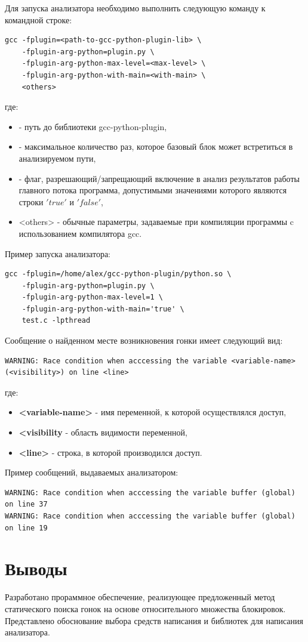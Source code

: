 Для запуска анализатора необходимо выполнить следующую команду к командной строке:
\begin{verbatim}
gcc -fplugin=<path-to-gcc-python-plugin-lib> \
    -fplugin-arg-python=plugin.py \
    -fplugin-arg-python-max-level=<max-level> \
    -fplugin-arg-python-with-main=<with-main> \
    <others>
\end{verbatim}
где:
\begin{itemize}
  \item <path-to-gcc-python-plugin-lib> - путь до библиотеки gcc-python-plugin,
  \item <max-level> - максимальное количество раз, которое базовый блок может встретиться в анализируемом пути,
  \item <with-main> - флаг, разрешающий/запрещающий включение в анализ результатов работы главного потока программа, допустимыми значениями которого являются строки $'true'$ и $'false'$,
  \item <others> - обычные параметры, задаваемые при компиляции программы c использованием компилятора gcc.
\end{itemize}

Пример запуска анализатора:
\begin{verbatim}
gcc -fplugin=/home/alex/gcc-python-plugin/python.so \
    -fplugin-arg-python=plugin.py \
    -fplugin-arg-python-max-level=1 \
    -fplugin-arg-python-with-main='true' \
    test.c -lpthread
\end{verbatim}

Сообщение о найденном месте возникновения гонки имеет следующий вид:
\begin{verbatim}
WARNING: Race condition when acccessing the variable <variable-name> (<visibility>) on line <line>
\end{verbatim}
где:
\begin{itemize}
  \item \textbf{<variable-name>} - имя переменной, к которой осуществлялся доступ,
  \item \textbf{<visibility} - область видимости переменной,
  \item \textbf{<line>} - строка, в которой производился доступ.
\end{itemize}

Пример сообщений, выдаваемых анализатором:
\begin{verbatim}
WARNING: Race condition when acccessing the variable buffer (global) on line 37
WARNING: Race condition when acccessing the variable buffer (global) on line 19
\end{verbatim}

\section{Выводы}

Разработано прораммное обеспечение, реализующее предложенный метод статического поиска гонок на основе относительного множества блокировок. Представлено обоснование выбора средств написания и библиотек для написания анализатора.
